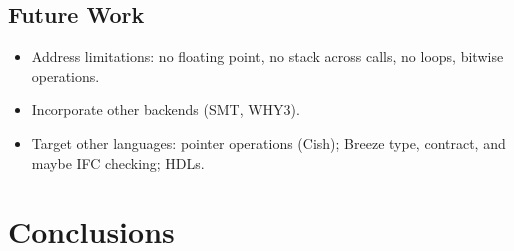 \documentclass{article}
\begin{document}
\subsection{Future Work}
\begin{itemize}
  \item Address limitations: no floating point, no stack across calls, no loops, bitwise operations.
  \item Incorporate other backends (SMT, WHY3).
  \item Target other languages: pointer operations (Cish); Breeze type, contract, and maybe IFC checking; HDLs.
\end{itemize}

\section{Conclusions}
\end{document}
